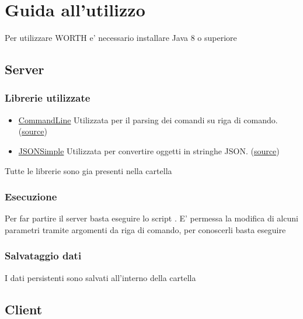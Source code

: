 \chapter*{Guida all'utilizzo}

Per utilizzare WORTH e' necessario installare Java 8 o superiore

\section*{Server}

\subsection*{Librerie utilizzate}
\begin{itemize}
    \item \href{http://search.maven.org/remotecontent?filepath=com/github/jankroken/commandline/1.7.0/commandline-1.7.0.jar}{CommandLine} Utilizzata per il parsing dei comandi su riga di comando. (\href{https://github.com/jankroken/commandline}{source})
    \item \href{https://storage.googleapis.com/google-code-archive-downloads/v2/code.google.com/json-simple/json-simple-1.1.1.jar}{JSONSimple} Utilizzata per convertire oggetti in stringhe JSON. (\href{https://github.com/fangyidong/json-simple}{source})
\end{itemize}
Tutte le librerie sono gia presenti nella cartella 
\subsection*{Esecuzione}
Per far partire il server basta eseguire lo script .
E' permessa la modifica di alcuni parametri tramite argomenti da riga di comando, per conoscerli basta eseguire
\begin{center}
\end{center}
\subsection*{Salvataggio dati}
I dati persistenti sono salvati all'interno della cartella 

\section*{Client}

